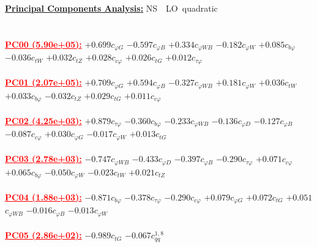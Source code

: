 \documentclass{article}
\begin{document}
\noindent \underline{\bf{Principal Components Analysis}:} \rm NS\ \ LO\ quadratic\\ \\ \\
\noindent \textcolor{red}{\underline{\bf{PC00} (5.90e+05):}}
{$+0.699$}{\rm $c_{\varphi G}$} 
{$-0.597$}{\rm $c_{\varphi B}$} 
{$+0.334$}{\rm $c_{\varphi WB}$} 
{$-0.182$}{\rm $c_{\varphi W}$} 
{$+0.085$}{\rm $c_{b \varphi}$} 
{$-0.036$}{\rm $c_{tW}$} 
{$+0.032$}{\rm $c_{tZ}$} 
{$+0.028$}{\rm $c_{c \varphi}$} 
{$+0.026$}{\rm $c_{tG}$} 
{$+0.012$}{\rm $c_{\tau \varphi}$} 
 \nonumber \\ \nonumber \\ 
\noindent \textcolor{red}{\underline{\bf{PC01} (2.07e+05):}}
{$+0.709$}{\rm $c_{\varphi G}$} 
{$+0.594$}{\rm $c_{\varphi B}$} 
{$-0.327$}{\rm $c_{\varphi WB}$} 
{$+0.181$}{\rm $c_{\varphi W}$} 
{$+0.036$}{\rm $c_{tW}$} 
{$+0.033$}{\rm $c_{b \varphi}$} 
{$-0.032$}{\rm $c_{tZ}$} 
{$+0.029$}{\rm $c_{tG}$} 
{$+0.011$}{\rm $c_{c \varphi}$} 
 \nonumber \\ \nonumber \\ 
\noindent \textcolor{red}{\underline{\bf{PC02} (4.25e+03):}}
{$+0.879$}{\rm $c_{\tau \varphi}$} 
{$-0.360$}{\rm $c_{b \varphi}$} 
{$-0.233$}{\rm $c_{\varphi WB}$} 
{$-0.136$}{\rm $c_{\varphi D}$} 
{$-0.127$}{\rm $c_{\varphi B}$} 
{$-0.087$}{\rm $c_{c \varphi}$} 
{$+0.030$}{\rm $c_{\varphi G}$} 
{$-0.017$}{\rm $c_{\varphi W}$} 
{$+0.013$}{\rm $c_{tG}$} 
 \nonumber \\ \nonumber \\ 
\noindent \textcolor{red}{\underline{\bf{PC03} (2.78e+03):}}
{$-0.747$}{\rm $c_{\varphi WB}$} 
{$-0.433$}{\rm $c_{\varphi D}$} 
{$-0.397$}{\rm $c_{\varphi B}$} 
{$-0.290$}{\rm $c_{\tau \varphi}$} 
{$+0.071$}{\rm $c_{c \varphi}$} 
{$+0.065$}{\rm $c_{b \varphi}$} 
{$-0.050$}{\rm $c_{\varphi W}$} 
{$-0.023$}{\rm $c_{tW}$} 
{$+0.021$}{\rm $c_{tZ}$} 
 \nonumber \\ \nonumber \\ 
\noindent \textcolor{red}{\underline{\bf{PC04} (1.88e+03):}}
{$-0.871$}{\rm $c_{b \varphi}$} 
{$-0.378$}{\rm $c_{\tau \varphi}$} 
{$-0.290$}{\rm $c_{c \varphi}$} 
{$+0.079$}{\rm $c_{\varphi G}$} 
{$+0.072$}{\rm $c_{tG}$} 
{$+0.051$}{\rm $c_{\varphi WB}$} 
{$-0.016$}{\rm $c_{\varphi B}$} 
{$-0.013$}{\rm $c_{\varphi W}$} 
 \nonumber \\ \nonumber \\ 
\noindent \textcolor{red}{\underline{\bf{PC05} (2.86e+02):}}
{$-0.989$}{\rm $c_{tG}$} 
{$-0.067$}{\rm $c_{qq}^{1,8}$} 
\end{document}
